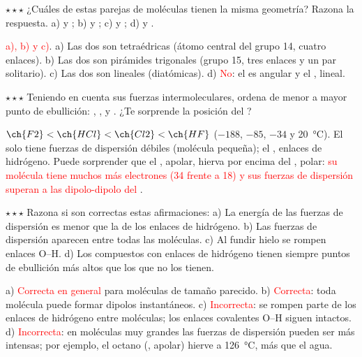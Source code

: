 \begin{exercise}
    \(\star\star\star\) ¿Cuáles de estas parejas de moléculas tienen la misma geometría? Razona la respuesta. a)  y
    ; b)  y ; c)  y ; d)  y .
    \begin{solu}
        \textcolor{red}{a), b) y c)}. a) Las dos son tetraédricas (átomo central del grupo 14, cuatro enlaces). b) Las dos son
        pirámides trigonales (grupo 15, tres enlaces y un par solitario). c) Las dos son lineales (diatómicas). d)
        \textcolor{red}{No}: el  es angular y el , lineal.
    \end{solu}
\end{exercise}

\begin{exercise}
    \(\star\star\star\) Teniendo en cuenta sus fuerzas intermoleculares, ordena de menor a mayor punto de ebullición: ,
    ,  y . ¿Te sorprende la posición del ?
    \begin{solu}
        \textcolor{red}{\(\ch{F2} < \ch{HCl} < \ch{Cl2} < \ch{HF}\)} (\(-188\), \(-85\), \(-34\) y \qty{20}{\degreeCelsius}). El
         solo tiene fuerzas de dispersión débiles (molécula pequeña); el , enlaces de hidrógeno. Puede sorprender que
        el , apolar, hierva por encima del , polar: \textcolor{red}{su molécula tiene muchos más electrones
        (34 frente a 18) y sus fuerzas de dispersión superan a las dipolo-dipolo del }.
    \end{solu}
\end{exercise}

\begin{exercise}
    \(\star\star\star\) Razona si son correctas estas afirmaciones: a) La energía de las fuerzas de dispersión es menor que la de
    los enlaces de hidrógeno. b) Las fuerzas de dispersión aparecen entre todas las moléculas. c) Al fundir hielo se rompen enlaces
    O--H. d) Los compuestos con enlaces de hidrógeno tienen siempre puntos de ebullición más altos que los que no los tienen.
    \begin{solu}
        a) \textcolor{red}{Correcta en general} para moléculas de tamaño parecido. b) \textcolor{red}{Correcta}: toda molécula
        puede formar dipolos instantáneos. c) \textcolor{red}{Incorrecta}: se rompen parte de los enlaces de hidrógeno entre
        moléculas; los enlaces covalentes O--H siguen intactos. d) \textcolor{red}{Incorrecta}: en moléculas muy grandes las fuerzas
        de dispersión pueden ser más intensas; por ejemplo, el octano (, apolar) hierve a \qty{126}{\degreeCelsius}, más
        que el agua.
    \end{solu}
\end{exercise}

